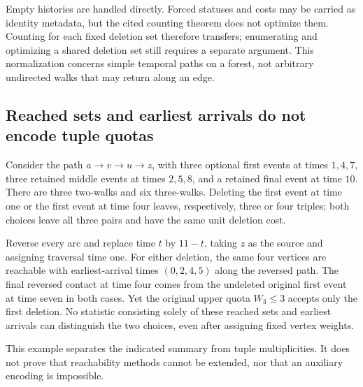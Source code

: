 Empty histories are handled directly. Forced statuses and costs may be
carried as identity metadata, but the cited counting theorem does not
optimize them. Counting for each fixed deletion set therefore transfers;
enumerating and optimizing a shared deletion set still requires a separate
argument. This normalization concerns simple temporal paths on a forest,
not arbitrary undirected walks that may return along an edge.

\subsection{Reached sets and earliest arrivals do not encode tuple quotas}
\label{app:reachability}

Consider the path $a\to v\to u\to z$, with three optional first events at
times $1,4,7$, three retained middle events at times $2,5,8$, and a retained
final event at time $10$. There are three two-walks and six three-walks.
Deleting the first event at time one or the first event at time four leaves,
respectively, three or four triples; both choices leave all three pairs and
have the same unit deletion cost.

Reverse every arc and replace time $t$ by $11-t$, taking $z$ as the source
and assigning traversal time one. For either deletion, the same four vertices
are reachable with earliest-arrival times $(0,2,4,5)$ along the reversed
path. The final reversed contact at time four comes from the undeleted
original first event at time seven in both cases. Yet the original upper
quota $W_3\le3$ accepts only the first deletion. No statistic consisting
solely of these reached sets and earliest arrivals can distinguish the two
choices, even after assigning fixed vertex weights.

This example separates the indicated summary from tuple multiplicities.
It does not prove that reachability methods cannot be extended, nor that an
auxiliary encoding is impossible.
